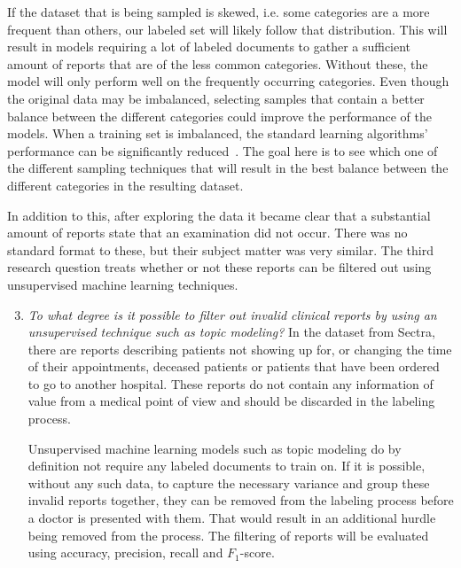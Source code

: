 \begin{enumerate}
      If the dataset that is being sampled is skewed, i.e. some categories are a more frequent than others, our labeled set will likely follow that distribution.
      This will result in models requiring a lot of labeled documents to gather a sufficient amount of reports that are of the less common categories.
      Without these, the model will only perform well on the frequently occurring categories.
      Even though the original data may be imbalanced, selecting samples that contain a better balance between the different categories could improve the performance of the models.
      When a training set is imbalanced, the standard learning algorithms' performance can be significantly reduced~\cite{he2009learning}.
      The goal here is to see which one of the different sampling techniques that will result in the best balance between the different categories in the resulting dataset.

\end{enumerate}

In addition to this, after exploring the data it became clear that a substantial amount of reports state that an examination did not occur.
There was no standard format to these, but their subject matter was very similar.
The third research question treats whether or not these reports can be filtered out using unsupervised machine learning techniques.

\begin{enumerate}
      \setcounter{enumi}{2}
      \item \label{intro:re-q3}
      \textit{To what degree is it possible to filter out invalid clinical reports by using an unsupervised technique such as topic modeling?}
      \newline
      In the dataset from Sectra, there are reports describing patients not showing up for, or changing the time of their appointments, deceased patients or patients that have been ordered to go to another hospital.
      These reports do not contain any information of value from a medical point of view and should be discarded in the labeling process.

      Unsupervised machine learning models such as topic modeling do by definition not require any labeled documents to train on.
      If it is possible, without any such data, to capture the necessary variance and group these invalid reports together, they can be removed from the labeling process before a doctor is presented with them.
      That would result in an additional hurdle being removed from the process.
      The filtering of reports will be evaluated using  accuracy, precision, recall and $F_1$-score.
\end{enumerate}

